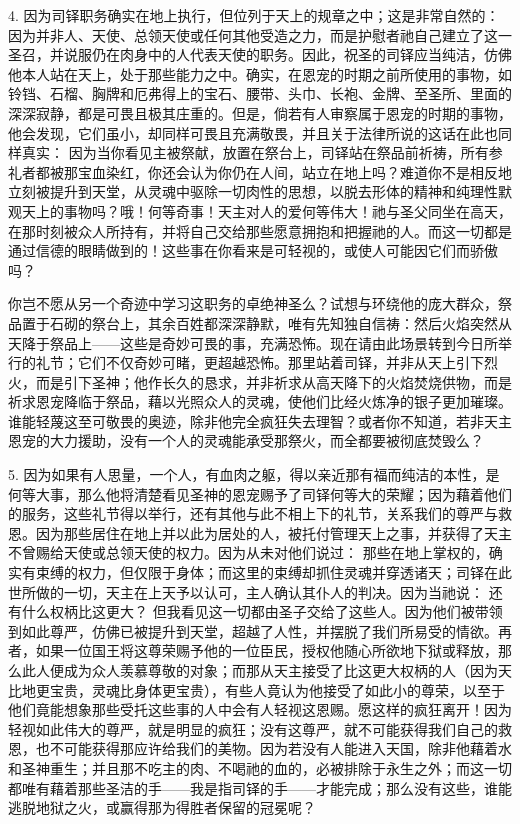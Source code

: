 4. 因为司铎职务确实在地上执行，但位列于天上的规章之中；这是非常自然的：因为并非人、天使、总领天使或任何其他受造之力，而是护慰者祂自己建立了这一圣召，并说服仍在肉身中的人代表天使的职务。因此，祝圣的司铎应当纯洁，仿佛他本人站在天上，处于那些能力之中。确实，在恩宠的时期之前所使用的事物，如铃铛、石榴、胸牌和厄弗得上的宝石、腰带、头巾、长袍、金牌、至圣所、里面的深深寂静，都是可畏且极其庄重的。但是，倘若有人审察属于恩宠的时期的事物，他会发现，它们虽小，却同样可畏且充满敬畏，并且关于法律所说的这话在此也同样真实：  因为当你看见主被祭献，放置在祭台上，司铎站在祭品前祈祷，所有参礼者都被那宝血染红，你还会认为你仍在人间，站立在地上吗？难道你不是相反地立刻被提升到天堂，从灵魂中驱除一切肉性的思想，以脱去形体的精神和纯理性默观天上的事物吗？哦！何等奇事！天主对人的爱何等伟大！祂与圣父同坐在高天，在那时刻被众人所持有，并将自己交给那些愿意拥抱和把握祂的人。而这一切都是通过信德的眼睛做到的！这些事在你看来是可轻视的，或使人可能因它们而骄傲吗？\par

你岂不愿从另一个奇迹中学习这职务的卓绝神圣么？试想与环绕他的庞大群众，祭品置于石砌的祭台上，其余百姓都深深静默，唯有先知独自信祷：然后火焰突然从天降于祭品上——这些是奇妙可畏的事，充满恐怖。现在请由此场景转到今日所举行的礼节；它们不仅奇妙可睹，更超越恐怖。那里站着司铎，并非从天上引下烈火，而是引下圣神；他作长久的恳求，并非祈求从高天降下的火焰焚烧供物，而是祈求恩宠降临于祭品，藉以光照众人的灵魂，使他们比经火炼净的银子更加璀璨。谁能轻蔑这至可敬畏的奥迹，除非他完全疯狂失去理智？或者你不知道，若非天主恩宠的大力援助，没有一个人的灵魂能承受那祭火，而全都要被彻底焚毁么？\par

5. 因为如果有人思量，一个人，有血肉之躯，得以亲近那有福而纯洁的本性，是何等大事，那么他将清楚看见圣神的恩宠赐予了司铎何等大的荣耀；因为藉着他们的服务，这些礼节得以举行，还有其他与此不相上下的礼节，关系我们的尊严与救恩。因为那些居住在地上并以此为居处的人，被托付管理天上之事，并获得了天主不曾赐给天使或总领天使的权力。因为从未对他们说过： 那些在地上掌权的，确实有束缚的权力，但仅限于身体；而这里的束缚却抓住灵魂并穿透诸天；司铎在此世所做的一切，天主在上天予以认可，主人确认其仆人的判决。因为当祂说： 还有什么权柄比这更大？ 但我看见这一切都由圣子交给了这些人。因为他们被带领到如此尊严，仿佛已被提升到天堂，超越了人性，并摆脱了我们所易受的情欲。再者，如果一位国王将这尊荣赐予他的一位臣民，授权他随心所欲地下狱或释放，那么此人便成为众人羡慕尊敬的对象；而那从天主接受了比这更大权柄的人（因为天比地更宝贵，灵魂比身体更宝贵），有些人竟认为他接受了如此小的尊荣，以至于他们竟能想象那些受托这些事的人中会有人轻视这恩赐。愿这样的疯狂离开！因为轻视如此伟大的尊严，就是明显的疯狂；没有这尊严，就不可能获得我们自己的救恩，也不可能获得那应许给我们的美物。因为若没有人能进入天国，除非他藉着水和圣神重生；并且那不吃主的肉、不喝祂的血的，必被排除于永生之外；而这一切都唯有藉着那些圣洁的手——我是指司铎的手——才能完成；那么没有这些，谁能逃脱地狱之火，或赢得那为得胜者保留的冠冕呢？\par


